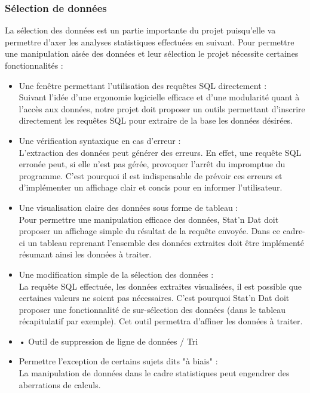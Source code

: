 \documentclass[a4paper,10pt]{report}
\begin{document}


\subsubsection{Sélection de données}

La sélection des données est un partie importante du projet puisqu'elle va permettre d'axer les analyses statistiques effectuées en suivant. Pour permettre une manipulation aisée des données et leur sélection le projet nécessite certaines fonctionnalités :\\

\begin{itemize}

\item Une fenêtre permettant l'utilisation des requêtes SQL directement :\\ Suivant l'idée d'une ergonomie logicielle efficace et d'une modularité quant à l'accès aux données, notre projet doit proposer un outils permettant d'inscrire directement les requêtes SQL pour extraire de la base les données désirées.

\item Une vérification syntaxique en cas d'erreur :\\ 
L'extraction des données peut générer des erreurs. En effet, une requête SQL erronée peut, si elle n'est pas gérée, provoquer l'arrêt du impromptue du programme. C'est pourquoi il est indispensable de prévoir ces erreurs et d'implémenter un affichage clair et concis pour en informer l'utilisateur.


\item Une visualisation claire des données sous forme de tableau :\\
Pour permettre une manipulation efficace des données, Stat'n Dat doit proposer un affichage simple du résultat de la requête envoyée. Dans ce cadre-ci un tableau reprenant l'ensemble des données extraites doit être implémenté résumant ainsi les données à traiter. 
\item Une modification simple de la sélection des données :\\
La requête SQL effectuée, les données extraites visualisées, il est possible que certaines valeurs ne soient pas nécessaires. C'est pourquoi Stat'n Dat doit proposer une fonctionnalité de sur-sélection des données (dans le tableau récapitulatif par exemple). Cet outil permettra d'affiner les données à traiter.

\item •	Outil de suppression de ligne de données / Tri

\item Permettre l'exception de certains sujets dits "à biais" :\\
La manipulation de données dans le cadre statistiques peut engendrer des aberrations de calculs.

\end{itemize}
\end{document}
